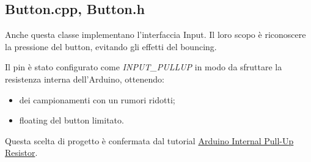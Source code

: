 \newpage
\subsection{Button.cpp, Button.h}
Anche questa classe implementano l'interfaccia Input. Il loro scopo è riconoscere la pressione del button, evitando gli effetti del bouncing.

Il pin è stato configurato come \textit{INPUT\_PULLUP} in modo da sfruttare la resistenza interna dell'Arduino, ottenendo:
\begin{itemize}
	\item dei campionamenti con un rumori ridotti;
	\item floating del button limitato.
\end{itemize}
Questa scelta di progetto è confermata dal tutorial \href{http://tinyurl.com/jqp8nwu}{Arduino Internal Pull-Up Resistor}.

